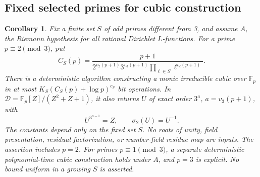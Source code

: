 \documentclass[11pt]{article}
\newtheorem{corollary}[theorem]{Corollary}
\theoremstyle{definition}
\theoremstyle{remark}
\begin{document}
\subsection{Fixed selected primes for cubic construction}

\begin{corollary}\label{cor:fixed-set-cubic-cofactor}
Fix a finite set \(S\) of odd primes different from 3, and assume
\(A\), the Riemann hypothesis for all rational Dirichlet
\(L\)-functions. For a prime \(p\equiv2\pmod3\), put
\[
 C_S(p)=\frac{p+1}{2^{v_2(p+1)}3^{v_3(p+1)}
                         \prod_{\ell\in S}\ell^{v_\ell(p+1)}}.
\]
There is a deterministic algorithm constructing a monic irreducible
cubic over \(\mathbb F_p\) in at most
\(K_S(C_S(p)+\log p)^{c_S}\) bit operations. In
\(\mathcal D=\mathbb F_p[Z]/(Z^2+Z+1)\), it also returns
\(U\) of exact order \(3^a\), \(a=v_3(p+1)\), with
\[
                        U^{3^{a-1}}=Z,\qquad
                        \sigma_2(U)=U^{-1}.
\]
The constants depend only on the fixed set \(S\). No roots of
unity, field presentation, residual factorization, or number-field
residue map are inputs. The assertion includes \(p=2\).
For primes \(p\equiv1\pmod3\), a separate deterministic
polynomial-time cubic construction holds under \(A\), and
\(p=3\) is explicit. No bound uniform in a growing \(S\) is asserted.
\end{corollary}
\end{document}
